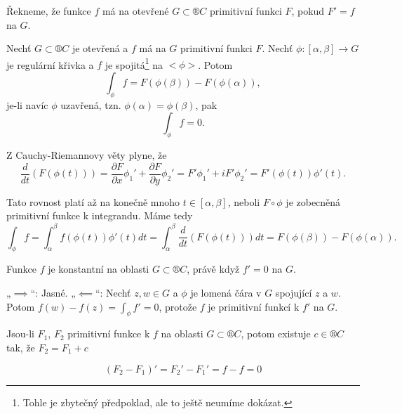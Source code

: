 \documentclass[12pt]{article}					%
\begin{document}
\begin{definice}
	Řekneme, že funkce $f$ má na otevřené $G \subset ®C$ primitivní funkci $F$, pokud $F' = f$ na $G$.
\end{definice}

\begin{veta}
	Nechť $G \subset ®C$ je otevřená a $f$ má na $G$ primitivní funkci $F$. Nechť $\phi:[\alpha, \beta] \rightarrow G$ je regulární křivka a $f$ je spojitá\footnote{Tohle je zbytečný předpoklad, ale to ještě neumíme dokázat.} na $<\phi>$. Potom
	$$ \int_\phi f = F(\phi(\beta)) - F(\phi(\alpha)), $$
	je-li navíc $\phi$ uzavřená, tzn. $\phi(\alpha) = \phi(\beta)$, pak
	$$ \int_\phi f = 0. $$


	\begin{dukazin}
        Z Cauchy-Riemannovy věty plyne, že
        $$ \frac{d}{dt}(F(\phi(t))) = \frac{\partial F}{\partial x} \phi_1' + \frac{\partial F}{\partial y} \phi_2' = F'\phi_1' + i F'\phi_2' = F'(\phi(t))\phi'(t). $$

        Tato rovnost platí až na konečně mnoho $t \in [\alpha, \beta]$, neboli $F \circ \phi$ je zobecněná primitivní funkce k integrandu. Máme tedy
        $$ \int_\phi f = \int_\alpha^\beta f(\phi(t))\phi'(t)dt = \int_\alpha^\beta \frac{d}{dt} (F(\phi(t))) dt = F(\phi(\beta)) - F(\phi(\alpha)). $$
	\end{dukazin}
\end{veta}

\begin{veta}
	Funkce $f$ je konstantní na oblasti $G \subset ®C$, právě když $f' = 0$ na $G$.

	\begin{dukazin}
		„$\implies$“: Jasné. „$\impliedby$“: Nechť $z, w \in G$ a $\phi$ je lomená čára v $G$ spojující $z$ a $w$. Potom $f(w) - f(z) = \int_\phi f' = 0$, protože $f$ je primitivní funkcí k $f'$ na $G$.
	\end{dukazin}
\end{veta}

\begin{dusledek}
	Jsou-li $F_1$, $F_2$ primitivní funkce k $f$ na oblasti $G \subset ®C$, potom existuje $c \in ®C$ tak, že $F_2 = F_1 + c$

	\begin{dukazin}
		$$ (F_2 - F_1)' = F_2' - F_1' = f - f = 0 $$
	\end{dukazin}
\end{dusledek}
\end{document}
